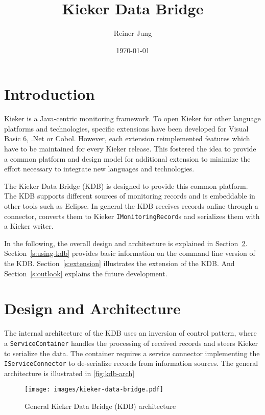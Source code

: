 \documentclass[11pt,a4paper]{article}
\title{Kieker Data Bridge}
\author{Reiner Jung}
\date{\today}
\begin{document}
\maketitle

\tableofcontents

\section{Introduction}  

Kieker is a Java-centric monitoring framework. To open Kieker for other language platforms and technologies, specific extensions have been developed for Visual Basic 6, .Net or Cobol. However, each extension reimplemented features which have to be maintained for every Kieker release. This fostered the idea to provide a common platform and design model for additional extension to minimize the effort necessary to integrate new languages and technologies.

The Kieker Data Bridge (KDB) is designed to provide this common platform. The KDB supports different sources of monitoring records and is embeddable in other tools such as Eclipse. In general the KDB receives records online through a connector, converts them to Kieker \texttt{IMonitoringRecord}s and serializes them with a Kieker writer.

In the following, the overall design and architecture is explained in Section~\ref{s:design}. Section~\ref{s:using-kdb} provides basic information on the command line version of the KDB. Section~\ref{s:extension} illustrates the extension of the KDB. And Section~\ref{s:outlook} explains the future development.

\section{Design and Architecture}\label{s:design}

The internal architecture of the KDB uses an inversion of control pattern, where a \texttt{ServiceContainer} handles the processing of received records and steers Kieker to serialize the data. The container requires a service connector implementing the \texttt{IServiceConnector} to de-serialize records from information sources. The general architecture is illustrated in \autoref{fig:kdb-arch}

\begin{figure}[htb]
\texttt{[image: images/kieker-data-bridge.pdf]}
\caption{General Kieker Data Bridge (KDB) architecture}
\label{fig:kdb-arch}
\end{figure}
\end{document}
